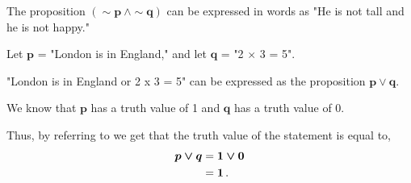 %
%

\begin{subquestions}
	
	
\subquestion
	
The proposition $\boldsymbol{(\sim p ~\land \sim q)}$ can be expressed in words as "He is not tall and he is not happy."
	
	
\subquestion
	
Let $\boldsymbol{p}$ = "London is in England," and let $\boldsymbol{q}$ = "2 $\times$ 3 = 5". 

"London is in England or 2 x 3 = 5" can be expressed as the proposition $\boldsymbol{p \lor q}$. 
	
We know that $\boldsymbol{p}$ has a truth value of 1 and $\boldsymbol{q}$ has a truth value of 0. 
	
Thus, by referring to  we get that the truth value of the statement is equal to,
\begin{align}
		\boldsymbol{p \lor q} &= \boldsymbol{1 \lor 0} \nonumber \\
		&= \boldsymbol{1} \,.
\end{align}
	
	
\subquestion
	

\end{subquestions}
